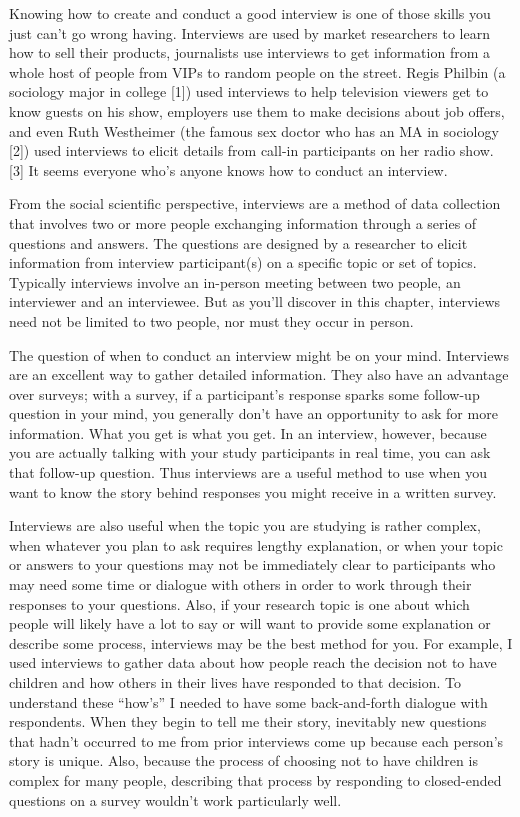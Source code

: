 Knowing how to create and conduct a good interview is one of those skills you just can’t go wrong having. Interviews are used by market researchers to learn how to sell their products, journalists use interviews to get information from a whole host of people from VIPs to random people on the street. Regis Philbin (a sociology major in college [1]) used interviews to help television viewers get to know guests on his show, employers use them to make decisions about job offers, and even Ruth Westheimer (the famous sex doctor who has an MA in sociology [2]) used interviews to elicit details from call-in participants on her radio show. [3] It seems everyone who’s anyone knows how to conduct an interview.

From the social scientific perspective, interviews are a method of data collection that involves two or more people exchanging information through a series of questions and answers. The questions are designed by a researcher to elicit information from interview participant(s) on a specific topic or set of topics. Typically interviews involve an in-person meeting between two people, an interviewer and an interviewee. But as you’ll discover in this chapter, interviews need not be limited to two people, nor must they occur in person.

The question of when to conduct an interview might be on your mind. Interviews are an excellent way to gather detailed information. They also have an advantage over surveys; with a survey, if a participant’s response sparks some follow-up question in your mind, you generally don’t have an opportunity to ask for more information. What you get is what you get. In an interview, however, because you are actually talking with your study participants in real time, you can ask that follow-up question. Thus interviews are a useful method to use when you want to know the story behind responses you might receive in a written survey.

Interviews are also useful when the topic you are studying is rather complex, when whatever you plan to ask requires lengthy explanation, or when your topic or answers to your questions may not be immediately clear to participants who may need some time or dialogue with others in order to work through their responses to your questions. Also, if your research topic is one about which people will likely have a lot to say or will want to provide some explanation or describe some process, interviews may be the best method for you. For example, I used interviews to gather data about how people reach the decision not to have children and how others in their lives have responded to that decision. To understand these “how’s” I needed to have some back-and-forth dialogue with respondents. When they begin to tell me their story, inevitably new questions that hadn’t occurred to me from prior interviews come up because each person’s story is unique. Also, because the process of choosing not to have children is complex for many people, describing that process by responding to closed-ended questions on a survey wouldn’t work particularly well.

